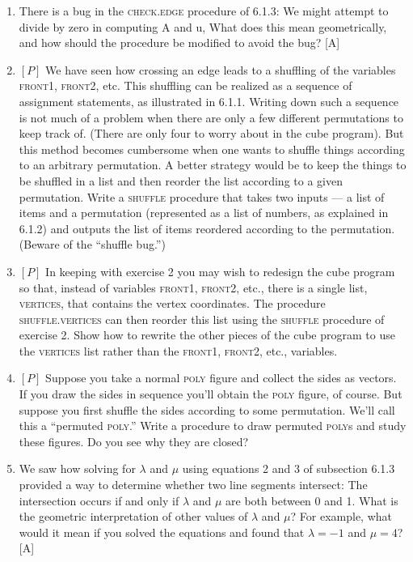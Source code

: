 \documentclass{book}
\begin{document}
\begin{enumerate}
\item There is a bug in the \textsc{check}\textsc{.edge} procedure of 6.1.3: We might
attempt to divide by zero in computing A and u, What does this mean
geometrically, and how should the procedure be modified to avoid the
bug? [A]

\item $[P]$ We have seen how crossing an edge leads to a shuffling of the variables 
\textsc{front1}, \textsc{front2}, etc. This shuffling can be realized as a sequence
of assignment statements, as illustrated in 6.1.1. Writing down such a
sequence is not much of a problem when there are only a few different
permutations to keep track of. (There are only four to worry about in
the cube program). But this method becomes cumbersome when one
wants to shuffle things according to an arbitrary permutation. A better
strategy would be to keep the things to be shuffled in a list and 
then reorder the list according to a given permutation. Write a \textsc{shuffle} procedure
that takes two inputs --- a list of items and a permutation (represented as
a list of numbers, as explained in 6.1.2) and outputs the list of items
reordered according to the permutation. (Beware of the ``shuffle bug.'')

\item $[P]$ In keeping with exercise 2 you may wish to redesign the cube
program so that, instead of variables \textsc{front1}, \textsc{front2}, etc., there is a
single list, \textsc{vertices}, that contains the vertex coordinates. 
The procedure \textsc{shuffle}\textsc{.vertices} can then reorder this list using the \textsc{shuffle}
procedure of exercise 2. Show how to rewrite the other pieces of the
cube program to use the \textsc{vertices} list rather than the \textsc{front1}, \textsc{front2},
etc., variables.

\item $[P]$ Suppose you take a normal \textsc{poly} figure and collect the sides as
vectors. If you draw the sides in sequence you'll obtain the \textsc{poly} figure,
of course. But suppose you first shuffle the sides according to some
permutation. We'll call this a ``permuted \textsc{poly}.'' Write a procedure to
draw permuted \textsc{poly}s and study these figures. Do you see why they are
closed?

\item We saw how solving for $\lambda$ and $\mu$ using equations 2 and 3 of subsection
6.1.3 provided a way to determine whether two line segments intersect:
The intersection occurs if and only if $\lambda$ and $\mu$ are both between 0 and
1. What is the geometric interpretation of other values of $\lambda$ and $\mu$? For
example, what would it mean if you solved the equations and found that
$\lambda = -1$ and $\mu = 4$? [A]


\end{enumerate}
\end{document}
